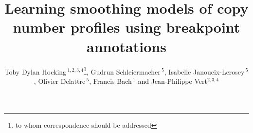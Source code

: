\documentclass{bioinfo}
\begin{document}

\title[
Learning
smoothing models
with
breakpoint annotations
]{
Learning smoothing models of copy number profiles
  using breakpoint annotations}

\author[Hocking \textit{et~al}]{Toby Dylan
  Hocking\,$^{1,2,3,4}$\footnote{to whom correspondence should be
    addressed}, 
Gudrun Schleiermacher\,$^5$, 
Isabelle Janoueix-Lerosey\,$^{5}$, 
Olivier Delattre\,$^5$, Francis Bach\,$^1$ and
  Jean-Philippe Vert$^{2,3,4}$ }

\address{$^{1}$INRIA -- Sierra project-team, Paris, F-75013, 
$^{2}$ Centre for computational biology, 
Mines ParisTech, Fontainebleau, F-77300, 
$^{3}$ Institut Curie, 
$^{4}$ INSERM U900 and
$^{5}$ INSERM U830, Paris, F-75248, France}



\maketitle
\end{document}
